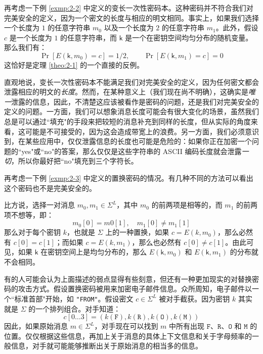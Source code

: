\begin{example}\label{exmp:2-5}
再考虑一下例 \ref{exmp:2-2} 中定义的变长一次性密码本。这种密码并不符合我们对完美安全的定义，因为一个密文的长度与相应的明文相同。事实上，如果我们选择一个长度为 $1$ 的任意字符串 $m_0$ 以及一个长度为 $2$ 的任意字符串 $m_1$。此外，假设 $c$ 是一个长度为 $1$ 的任意字符串，而 $\mathsf{k}$ 是一个在密钥空间均匀分布的随机变量。那么我们有：
$$
\Pr[E(\mathsf{k},m_0)=c]={1}/{2},\quad\quad
\Pr[E(\mathsf{k},m_1)=c]=0
$$
这恰好是定理 \ref{theo:2-1} 的一个直接的反例。

直观地说，变长一次性密码本不能满足我们对完美安全的定义，因为任何密文都会泄露相应的明文的\emph{长度}。然而，在某种意义上（我们现在尚不明确），这确实是\emph{唯一}泄露的信息，因此，不清楚这应该被看作是密码的问题，还是我们对完美安全的定义的问题。一方面，我们可以想象消息长度可能会有很大变化的场景，虽然我们总是可以通过``填充"的手段来把较短的消息补充到同样的长度，但从实际的角度来看，这可能是不可接受的，因为这会造成带宽上的浪费。另一方面，我们必须意识到，在某些应用中，仅仅泄露信息的长度也可能是危险的：如果你正在加密一个问题的``yes"或``no"的答案，那么仅仅是这些字符串的 ASCII 编码长度就会泄露\emph{一切}，所以你最好把``no"填充到三个字符长。

\end{example}

\begin{example}\label{exmp:2-6}
再考虑一下例 \ref{exmp:2-3} 中定义的置换密码的情况。有几种不同的方法可以看出这个密码也不是完美安全的。

比方说，选择一对消息 $m_0,m_1\in\Sigma^L$，其中 $m_0$ 的前两项是相等的，而 $m_1$ 的前两项不想等，即：
$$
m_0[0]=m0[1],\quad
m_1[0]\neq m_1[1]
$$
那么对于每个密钥 $k$，也就是 $\Sigma$ 上的一种置换，如果 $c = E(k,m_0)$，那么必然有 $c[0] = c[1]$；而如果 $c = E(k,m_1)$，那么也必然有 $c[0]\neq c[1]$。由此可见，如果 $\mathsf{k}$ 在密钥空间上是均匀分布的，那么 $E(\mathsf{k},m_0)$ 和 $E(\mathsf{k},m_1)$ 的分布就不会相同。

有的人可能会认为上面描述的弱点显得有些刻意，但还有一种更加现实的对替换密码的攻击方式。假设置换密码被用来加密电子邮件信息。众所周知，电子邮件以一个``标准首部"开始，如 \texttt{"FROM"}。假设密文 $c\in\Sigma^L$ 被对手截获。因为密钥 $k$ 其实就是 $\Sigma$ 的一个排列组合。对手知道：
$$
c[0\dots3]=(k(\mathtt F),k(\mathtt R),k(\mathtt O),k(\mathtt M))
$$
因此，如果原始消息 $m\in\Sigma^L$，对手现在可以找到 $m$ 中所有出现 $\mathtt F$、$\mathtt R$、$\mathtt O$ 和 $\mathtt M$ 的位置。仅仅根据这些信息，再加上关于消息的具体上下文信息和关于字母频率的一般信息，对手就可能能够推断出关于原始消息的相当多的信息。
\end{example}

